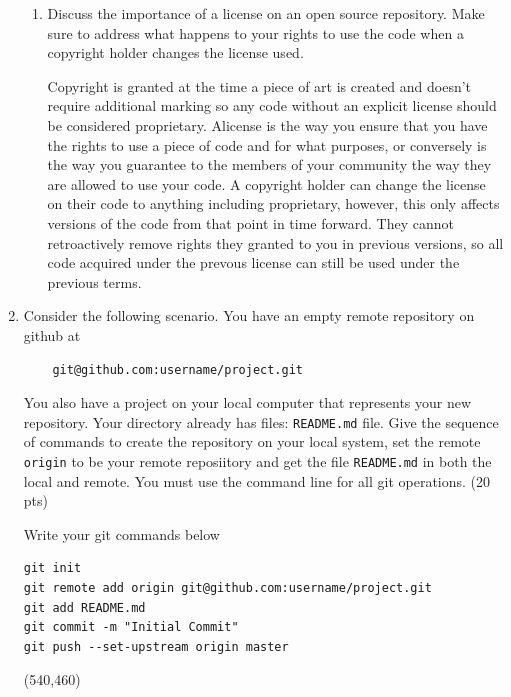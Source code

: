 \documentclass[10pt]{article}
\begin{document}
\begin{enumerate}
\begin{enumerate}
	\item Discuss the importance of a license on an open source repository. Make sure to address what happens to your rights to use the code when a copyright holder changes the license used.

	\beginanswers
Copyright is granted at the time a piece of art is created and doesn't require additional marking so any code without an explicit license should be considered proprietary. Alicense is the way you ensure that you have the rights to use a piece of code and for what purposes, or conversely is the way you guarantee to the members of your community the way they are allowed to use your code. A copyright holder can change the license on their code to anything including proprietary, however, this only affects versions of the code from that point in time forward. They cannot retroactively remove rights they granted to you in previous versions, so all code acquired under the prevous license can still be used under the previous terms.
\else
\bigskip
\bigskip
\bigskip
\bigskip
\bigskip
\bigskip
\bigskip
\bigskip
\bigskip
\bigskip
\bigskip
\bigskip
\bigskip
\bigskip
\bigskip
\bigskip
\bigskip
\bigskip
\bigskip
\bigskip
\fi
\end{enumerate}
	
\newpage


\item Consider the following scenario. You have an empty remote repository on github at
\begin{verbatim}
	git@github.com:username/project.git
\end{verbatim} 

You also have a  project on your local computer that represents your new repository. Your directory already has files: \verb|README.md| file. Give the sequence of commands to create the repository on your local system, set the remote \verb|origin| to be your remote reposiitory and get the file \verb*|README.md| in both the local and remote. You must use the command line for all git operations. (20 pts)

Write your git commands below

\beginanswers
\begin{lstlisting}
git init
git remote add origin git@github.com:username/project.git
git add README.md 
git commit -m "Initial Commit"
git push --set-upstream origin master
\end{lstlisting}
\else
\hspace*{-0.4in}\framebox(540,460){}
\fi
\newpage


\end{enumerate}
\end{document}
